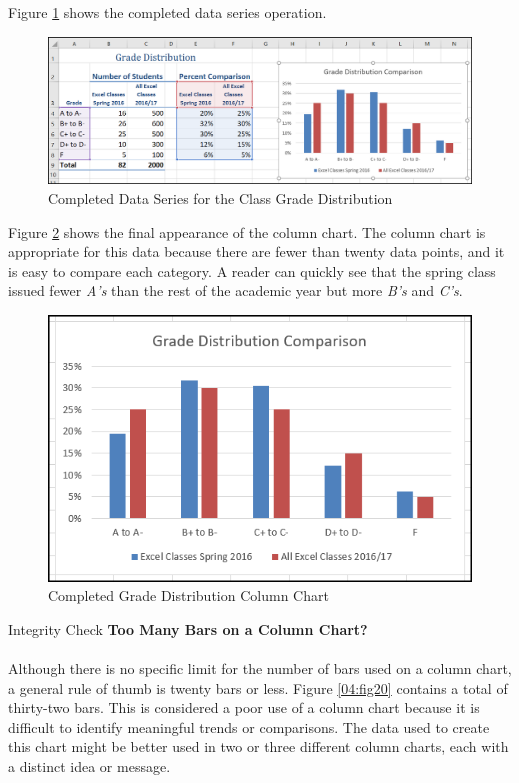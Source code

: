 Figure \ref{04:fig18} shows the completed data series operation.

\begin{figure}[H]
	\centering
	\includegraphics[width=\maxwidth{.95\linewidth}]{gfx/ch04_fig18}
	\caption{Completed Data Series for the Class Grade Distribution}
	\label{04:fig18}
\end{figure}

Figure \ref{04:fig19} shows the final appearance of the column chart. The column chart is appropriate for this data because there are fewer than twenty data points, and it is easy to compare each category. A reader can quickly see that the spring class issued fewer \textit{A's} than the rest of the academic year but more \textit{B's} and \textit{C's}.

\begin{figure}[H]
	\centering
	\includegraphics[width=\maxwidth{.95\linewidth}]{gfx/ch04_fig19}
	\caption{Completed Grade Distribution Column Chart}
	\label{04:fig19}
\end{figure}

\begin{center}
	\begin{infobox}{Integrity Check}
		\textbf{Too Many Bars on a Column Chart?}
		\\
		\\
		 Although there is no specific limit for the number of bars used on a column chart, a general rule of thumb is twenty bars or less. Figure \ref{04:fig20} contains a total of thirty-two bars. This is considered a poor use of a column chart because it is difficult to identify meaningful trends or comparisons. The data used to create this chart might be better used in two or three different column charts, each with a distinct idea or message.
	\end{infobox}
\end{center}

